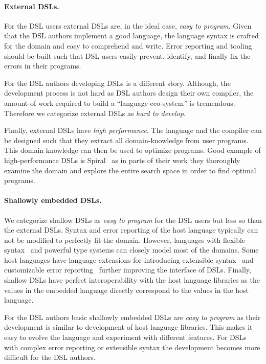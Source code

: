 \paragraph{External DSLs.} For the DSL users external DSLs are, in the ideal case, \emph{easy to program}. Given that
the DSL authors implement a good language, the language syntax is crafted for the domain
and easy to comprehend and write. Error reporting and tooling should be built such that DSL users
easily prevent, identify, and finally fix the errors in their programs.

For the DSL authors developing DSLs is a different story. Although, the development
process is not hard as DSL authors design their own compiler, the amount of work
required to build a ``language eco-system'' is tremendous. Therefore we categorize
external DSLs as \emph{hard to develop}.

Finally, external DSLs have \emph{high performance}. The language and the compiler can be
designed such that they extract all domain-knowledge from user programs. This domain knowledge
can then be used to optimize programs. Good example of high-performance DSLs is Spiral~
as in parts of their work they thoroughly examine the domain and explore the entire
search space in order to find optimal programs.


\paragraph{Shallowly embedded DSLs.} We categorize shallow DSLs as \emph{easy to program} for
 the DSL users but less so than the external DSLs. Syntax and error reporting of the host language
 typically can not be modified to perfectly fit the domain. However, languages with flexible syntax~ and
 powerful type systems can closely model most of the domains. Some host languages have language extensions for
 introducing extensible syntax~ and customizable error reporting~ further
 improving the interface of DSLs. Finally, shallow DSLs have perfect interoperability with
 the host language libraries as the values in the embedded language directly correspond
 to the values in the host language.

For the DSL authors basic shallowly embedded DSLs are \emph{easy to program} as their
 development is similar to development of host language libraries. This makes it easy
 to evolve the language and experiment with different features. For DSLs
 with complex error reporting or extensible syntax the development
 becomes more difficult for the DSL authors.

